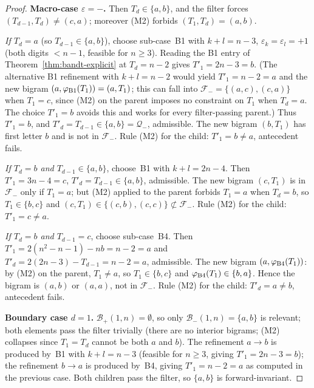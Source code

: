 \documentclass{amsart}
\theoremstyle{definition}
\theoremstyle{remark}
\begin{document}
\begin{proof}
\smallskip\noindent\textbf{Macro-case $\varepsilon = -$.}
Then $T_d \in \{a, b\}$, and the filter forces $(T_{d-1}, T_d)
\ne (c, a)$; moreover \textup{(M2)} forbids $(T_1, T_d) = (a, b)$.

\emph{If $T_d = a$} \textup{(}so $T_{d-1} \in \{a, b\}$\textup{)},
choose sub-case~\textup{B1} with $k + l = n - 3$, $\varepsilon_k =
\varepsilon_l = +1$ \textup{(}both digits $< n-1$, feasible for
$n \ge 3$\textup{)}.  Reading the B1 entry of
Theorem~\ref{thm:bandt-explicit} at $T_d = n - 2$ gives $T'_1 =
2n - 3 = b$.  \textup{(}The alternative B1 refinement with $k + l
= n - 2$ would yield $T'_1 = n - 2 = a$ and the new bigram $(a,
\varphi_{\textup{B1}}(T_1)) = (a, T_1)$; this can fall into
$\mathcal{F}_- = \{(a, c), (c, a)\}$ when $T_1 = c$, since
\textup{(M2)} on the parent imposes no constraint on $T_1$ when
$T_d = a$.  The choice $T'_1 = b$ avoids this and works for every
filter-passing parent.\textup{)}  Thus $T'_1 = b$, and $T'_d =
T_{d-1} \in \{a, b\} = \mathcal{Q}_-$, admissible.  The new bigram
$(b, T_1)$ has first letter $b$ and is not in $\mathcal{F}_-$.
Rule \textup{(M2)} for the child: $T'_1 = b \ne a$, antecedent
fails.

\emph{If $T_d = b$ and $T_{d-1} \in \{a, b\}$}, choose~\textup{B1}
with $k + l = 2n - 4$.  Then $T'_1 = 3n - 4 = c$, $T'_d = T_{d-1}
\in \{a, b\}$, admissible.  The new bigram $(c, T_1)$ is in
$\mathcal{F}_-$ only if $T_1 = a$; but \textup{(M2)} applied to
the parent forbids $T_1 = a$ when $T_d = b$, so $T_1 \in \{b, c\}$
and $(c, T_1) \in \{(c, b), (c, c)\} \not\subset \mathcal{F}_-$.
Rule \textup{(M2)} for the child: $T'_1 = c \ne a$.

\emph{If $T_d = b$ and $T_{d-1} = c$}, choose sub-case~\textup{B4}.
Then $T'_1 = 2(n^2 - n - 1) - nb = n - 2 = a$ and $T'_d =
2(2n - 3) - T_{d-1} = n - 2 = a$, admissible.  The new bigram
$(a, \varphi_{\textup{B4}}(T_1))$: by \textup{(M2)} on the parent,
$T_1 \ne a$, so $T_1 \in \{b, c\}$ and $\varphi_{\textup{B4}}(T_1)
\in \{b, a\}$.  Hence the bigram is $(a, b)$ or $(a, a)$, not in
$\mathcal{F}_-$.  Rule \textup{(M2)} for the child: $T'_d = a \ne
b$, antecedent fails.

\smallskip\noindent\textbf{Boundary case $d = 1$.}
$\mathcal{B}_+(1, n) = \emptyset$, so only $\mathcal{B}_-(1, n) =
\{a, b\}$ is relevant; both elements pass the filter trivially
\textup{(}there are no interior bigrams; \textup{(M2)} collapses
since $T_1 = T_d$ cannot be both $a$ and $b$\textup{)}.  The
refinement $a \to b$ is produced by~\textup{B1} with $k + l =
n - 3$ \textup{(}feasible for $n \ge 3$, giving $T'_1 = 2n - 3 =
b$\textup{)}; the refinement $b \to a$ is produced by~\textup{B4},
giving $T'_1 = n - 2 = a$ as computed in the previous case.  Both
children pass the filter, so $\{a, b\}$ is forward-invariant.
\end{proof}
\end{document}
